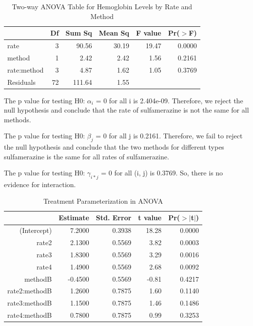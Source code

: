 \documentclass{article}
\begin{document}
\begin{table}[ht]
\centering
\caption{Two-way ANOVA Table for Hemoglobin Levels by Rate and Method} 
\label{tab:hemoglobin_anova}
\begin{tabular}{lrrrrr}
  \hline
 & Df & Sum Sq & Mean Sq & F value & Pr($>$F) \\ 
  \hline
rate & 3 & 90.56 & 30.19 & 19.47 & 0.0000 \\ 
  method & 1 & 2.42 & 2.42 & 1.56 & 0.2161 \\ 
  rate:method & 3 & 4.87 & 1.62 & 1.05 & 0.3769 \\ 
  Residuals & 72 & 111.64 & 1.55 &  &  \\ 
   \hline
\end{tabular}
\end{table}

The p value for testing H0: $\alpha_i$ = 0 for all i is 2.404e-09. 
Therefore, we reject the null hypothesis and conclude that the rate of sulfamerazine is not the same for all methods.

The p value for testing H0: $\beta_j$ = 0 for all j is 0.2161.
Therefore, we fail to reject the null hypothesis and conclude that the two methods for different types sulfamerazine is the same for all rates of sulfamerazine.

The p value for testing H0: $\gamma_{i*j}$ = 0 for all (i, j) is 0.3769.
So, there is no evidence for interaction.
\begin{table}[ht]
\caption{Treatment Parameterization in ANOVA}
\label{tab:treatment}
\centering
\begin{tabular}{rrrrr}
  \hline
 & Estimate & Std. Error & t value & Pr($>$$|$t$|$) \\ 
  \hline
(Intercept) & 7.2000 & 0.3938 & 18.28 & 0.0000 \\ 
  rate2 & 2.1300 & 0.5569 & 3.82 & 0.0003 \\ 
  rate3 & 1.8300 & 0.5569 & 3.29 & 0.0016 \\ 
  rate4 & 1.4900 & 0.5569 & 2.68 & 0.0092 \\ 
  methodB & -0.4500 & 0.5569 & -0.81 & 0.4217 \\ 
  rate2:methodB & 1.2600 & 0.7875 & 1.60 & 0.1140 \\ 
  rate3:methodB & 1.1500 & 0.7875 & 1.46 & 0.1486 \\ 
  rate4:methodB & 0.7800 & 0.7875 & 0.99 & 0.3253 \\ 
   \hline
\end{tabular}
\end{table}
\end{document}
